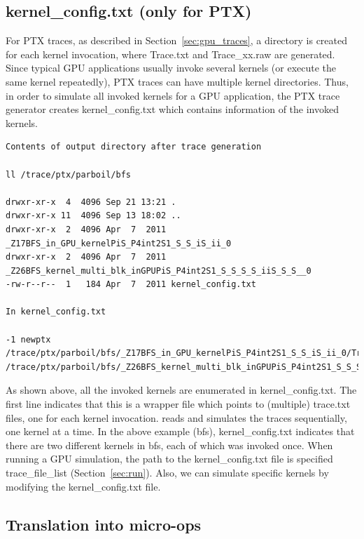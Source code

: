 \subsection{kernel\_config.txt (only for PTX)}
\label{sec:kern_config}

For PTX traces, as described in Section~\ref{sec:gpu_traces}, a directory is
created for each kernel invocation, where Trace.txt and Trace\_xx.raw are
generated. Since typical GPU applications usually invoke several kernels (or
execute the same kernel repeatedly), PTX traces can have multiple kernel
directories. Thus, in order to simulate all invoked kernels for a GPU
application, the PTX trace generator creates kernel\_config.txt which contains
information of the invoked kernels.


\begin{Verbatim}
Contents of output directory after trace generation

ll /trace/ptx/parboil/bfs

drwxr-xr-x  4  4096 Sep 21 13:21 .
drwxr-xr-x 11  4096 Sep 13 18:02 ..
drwxr-xr-x  2  4096 Apr  7  2011 _Z17BFS_in_GPU_kernelPiS_P4int2S1_S_S_iS_ii_0
drwxr-xr-x  2  4096 Apr  7  2011 _Z26BFS_kernel_multi_blk_inGPUPiS_P4int2S1_S_S_S_S_iiS_S_S__0
-rw-r--r--  1   184 Apr  7  2011 kernel_config.txt

In kernel_config.txt

-1 newptx
/trace/ptx/parboil/bfs/_Z17BFS_in_GPU_kernelPiS_P4int2S1_S_S_iS_ii_0/Trace.txt
/trace/ptx/parboil/bfs/_Z26BFS_kernel_multi_blk_inGPUPiS_P4int2S1_S_S_S_S_iiS_S_S__0/Trace.txt
\end{Verbatim}


As shown above, all the invoked kernels are enumerated in kernel\_config.txt.
The first line indicates that this is a wrapper file which points to (multiple)
trace.txt files, one for each kernel invocation. \SIM reads and simulates the
traces sequentially, one kernel at a time.  In the above example (bfs),
kernel\_config.txt indicates that there are two different kernels in bfs,
each of which was invoked once. When running a GPU simulation, the path to
the kernel\_config.txt file is specified trace\_file\_list
(Section~\ref{sec:run}).  Also, we can simulate specific kernels
by modifying the kernel\_config.txt file.

\subsection{Translation into micro-ops}

